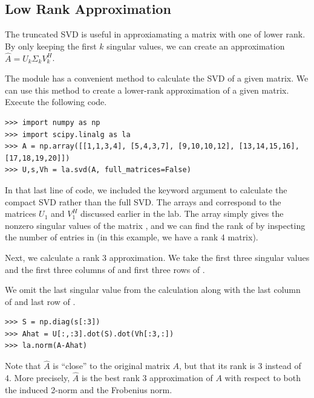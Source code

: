 \subsection*{Low Rank Approximation}
The truncated SVD is useful in approxiamating a matrix with one of lower rank.
By only keeping the first $k$ singular values, we can create an approximation $\widehat A = U_k\Sigma_k V_k^H$.

The  module has a convenient method to calculate the SVD of a given matrix. We can use
this method to create a lower-rank approximation of a given matrix. Execute the following code.
\begin{lstlisting}
>>> import numpy as np
>>> import scipy.linalg as la
>>> A = np.array([[1,1,3,4], [5,4,3,7], [9,10,10,12], [13,14,15,16], [17,18,19,20]])
>>> U,s,Vh = la.svd(A, full_matrices=False)
\end{lstlisting}
In that last line of code, we included the keyword argument  to calculate the
compact SVD rather than the full SVD. The arrays  and  correspond to the matrices
$U_1$ and $V_1^H$ discussed earlier in the lab. The array  simply gives the nonzero singular values
of the matrix , and we can find the rank of  by inspecting the number of entries in  (in this
example, we have a rank 4 matrix). 

Next, we calculate a rank 3 approximation.
We take the first three singular values and the first three columns of  and first three rows of .

We omit the last singular value from the calculation along with the last column of  and last row of .

\begin{lstlisting}
>>> S = np.diag(s[:3])
>>> Ahat = U[:,:3].dot(S).dot(Vh[:3,:])
>>> la.norm(A-Ahat)
\end{lstlisting}
Note that $\widehat A$ is ``close'' to the original matrix $A$, but that its rank is 3 instead of 4. More
precisely, $\widehat A$ is the best rank 3 approximation of $A$ with respect to both the induced 2-norm and
the Frobenius norm. 

